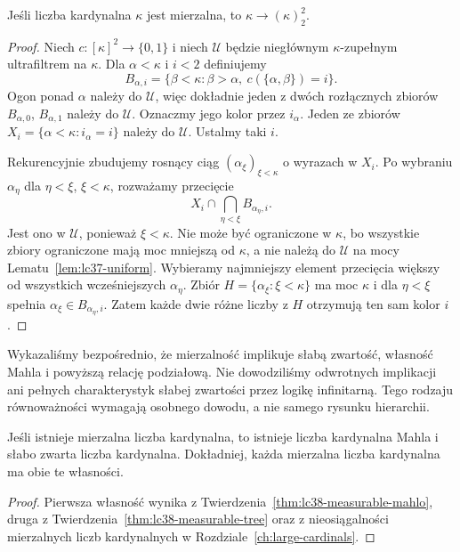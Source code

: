 \begin{twierdzenie}
\label{thm:lc38-measurable-partition}
Jeśli liczba kardynalna $\kappa$ jest mierzalna,
to $\kappa\longrightarrow(\kappa)^2_2$.
\end{twierdzenie}
\begin{proof}
Niech $c:[\kappa]^2\to\{0,1\}$
i niech $\mathcal U$ będzie
niegłównym $\kappa$-zupełnym
ultrafiltrem na $\kappa$.
Dla $\alpha<\kappa$ i $i<2$
definiujemy
\[
 B_{\alpha,i}
 =\{\beta<\kappa:\beta>\alpha,\
                   c(\{\alpha,\beta\})=i\}.
\]
Ogon ponad $\alpha$ należy
do $\mathcal U$, więc dokładnie
jeden z dwóch rozłącznych
zbiorów $B_{\alpha,0}$,
$B_{\alpha,1}$ należy do
$\mathcal U$. Oznaczmy
jego kolor przez $i_\alpha$.
Jeden ze zbiorów
$X_i=\{\alpha<\kappa:i_\alpha=i\}$
należy do $\mathcal U$.
Ustalmy taki $i$.

Rekurencyjnie zbudujemy rosnący
ciąg $(\alpha_\xi)_{\xi<\kappa}$
o wyrazach w $X_i$.
Po wybraniu $\alpha_\eta$
dla $\eta<\xi$, $\xi<\kappa$,
rozważamy przecięcie
\[
 X_i\cap\bigcap_{\eta<\xi}
                      B_{\alpha_\eta,i}.
\]
Jest ono w $\mathcal U$,
ponieważ $\xi<\kappa$.
Nie może być ograniczone w
$\kappa$, bo wszystkie zbiory
ograniczone mają moc mniejszą
od $\kappa$, a nie należą do
$\mathcal U$ na mocy
Lematu~\ref{lem:lc37-uniform}.
Wybieramy najmniejszy element
przecięcia większy od wszystkich
wcześniejszych $\alpha_\eta$.
Zbiór
$H=\{\alpha_\xi:\xi<\kappa\}$
ma moc $\kappa$ i dla
$\eta<\xi$ spełnia
$\alpha_\xi\in B_{\alpha_\eta,i}$.
Zatem każde dwie różne
liczby z $H$ otrzymują
ten sam kolor $i$.
\end{proof}

\begin{uwaga}
\label{rem:lc38-implications}
Wykazaliśmy bezpośrednio, że
mierzalność implikuje słabą
zwartość, własność Mahla i
powyższą relację podziałową.
Nie dowodziliśmy odwrotnych
implikacji ani pełnych
charakterystyk słabej zwartości
przez logikę infinitarną.
Tego rodzaju równoważności
wymagają osobnego dowodu,
a nie samego rysunku hierarchii.
\end{uwaga}

\begin{wniosek}
\label{cor:lc38-hierarchy}
Jeśli istnieje mierzalna liczba kardynalna,
to istnieje liczba kardynalna Mahla
i słabo zwarta liczba kardynalna.
Dokładniej, każda mierzalna liczba kardynalna ma obie te własności.
\end{wniosek}
\begin{proof}
Pierwsza własność wynika
z Twierdzenia~\ref{thm:lc38-measurable-mahlo},
druga z
Twierdzenia~\ref{thm:lc38-measurable-tree}
oraz z nieosiągalności
mierzalnych liczb kardynalnych
w Rozdziale~\ref{ch:large-cardinals}.
\end{proof}

